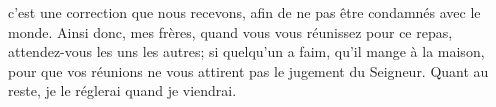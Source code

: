 	c’est une correction que nous recevons,
	afin de ne pas être condamnés avec le monde.
Ainsi donc, mes frères, quand vous vous réunissez pour ce repas,
	attendez-vous les uns les autres;
	si quelqu’un a faim, qu’il mange à la maison,
	pour que vos réunions ne vous attirent pas le jugement du Seigneur.
Quant au reste, je le réglerai quand je viendrai.
